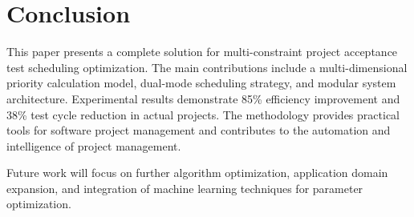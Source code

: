 \documentclass[journal]{IEEEtran}
\begin{document}
\section{Conclusion}
This paper presents a complete solution for multi-constraint project acceptance test scheduling optimization. The main contributions include a multi-dimensional priority calculation model, dual-mode scheduling strategy, and modular system architecture. Experimental results demonstrate 85\% efficiency improvement and 38\% test cycle reduction in actual projects. The methodology provides practical tools for software project management and contributes to the automation and intelligence of project management.

Future work will focus on further algorithm optimization, application domain expansion, and integration of machine learning techniques for parameter optimization.
\end{document}
